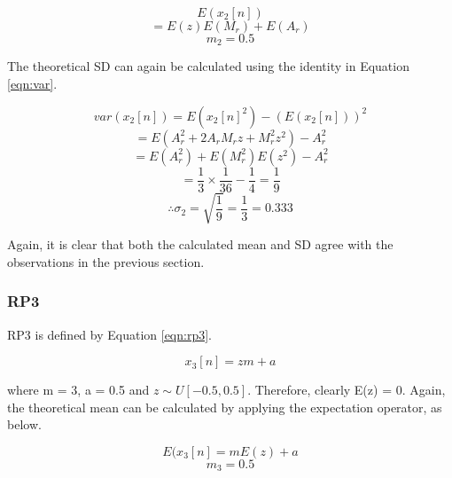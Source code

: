 \begin{center}
\begin{equation}
E(x_{2}[n] )
\end{equation} \begin{equation}
= E(z)E(M_{r})+E(A_{r}) 
\end{equation} \begin{equation}
m_{2} = 0.5
\end{equation}
\end{center}

\noindent
The theoretical SD can again be calculated using the identity in Equation \ref{eqn:var}.

\begin{center}
\begin{equation}
var(x_{2}[n]) =  E({x_{2}[n]}^2) - (E({x_{2}[n]}))^2 
\end{equation} \begin{equation}
= E(A_{r}^{2}+2A_{r}M_{r}z+M_{r}^{2}z^{2}) - A_{r}^2
\end{equation} \begin{equation}
= E(A_{r}^{2})+ E(M_{r}^{2})E(z^{2}) - A_{r}^2
\end{equation} \begin{equation}
= \frac{1}{3} \times \frac{1}{36} - \frac{1}{4} = \frac{1}{9}
\end{equation} \begin{equation}
\therefore \sigma_{2} = \sqrt{\frac{1}{9}} = \frac{1}{3} = 0.333
\end{equation}
\end{center}

\noindent
Again, it is clear that both the calculated mean and SD agree with the observations in the previous section.

\subsubsection*{RP3}

RP3 is defined by Equation \ref{eqn:rp3}.

\begin{equation}
    x_{3}[n] = zm + a
    \label{eqn:rp3}
\end{equation}

\noindent
where m = 3, a = 0.5 and $z \sim U[-0.5,0.5]$. Therefore, clearly E(z) = 0.
\noindent
Again, the theoretical mean can be calculated by applying the expectation operator, as below.

\begin{center}
\begin{equation}
E(x_{3}[n]=mE(z)+a
\end{equation} \begin{equation}
m_{3} = 0.5
\end{equation}
\end{center}

